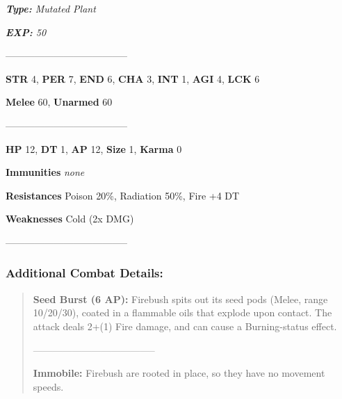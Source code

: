 \documentclass[11pt,a4paper,twocolumn]{book}
\begin{document}
	\noindent
	\emph{\textbf{Type:} Mutated Plant}
	
	\noindent
	\emph{\textbf{EXP:} 50}
	
%		
%	
%		

	--------------------------------------

	\noindent
	\textbf{STR} 4, \textbf{PER} 7, \textbf{END} 6, \textbf{CHA} 3, \textbf{INT} 1, \textbf{AGI} 4, \textbf{LCK} 6
	
	\noindent
	\textbf{Melee} 60, \textbf{Unarmed} 60
	
	--------------------------------------
	
	\noindent
	\textbf{HP} 12, \textbf{DT} 1, \textbf{AP} 12, \textbf{Size} 1, \textbf{Karma} 0
	
	
	\noindent
	\textbf{Immunities} \emph{none}
	
	\noindent
	\textbf{Resistances} Poison 20\%, Radiation 50\%, Fire +4 DT
	
	\noindent
	\textbf{Weaknesses} Cold (2x DMG) %
	
	--------------------------------------
	
	\subsubsection*{Additional Combat Details:}
	\begin{verse}
		\textbf{Seed Burst (6 AP):} Firebush spits out its seed pods (Melee, range 10/20/30), coated in a flammable oils that explode upon contact. The attack deals 2+(1) Fire damage, and can cause a Burning-status effect.
		
		--------------------------------------
		
		\textbf{Immobile:} Firebush are rooted in place, so they have no movement speeds. 
		
		
	\end{verse}
	
\end{document}
